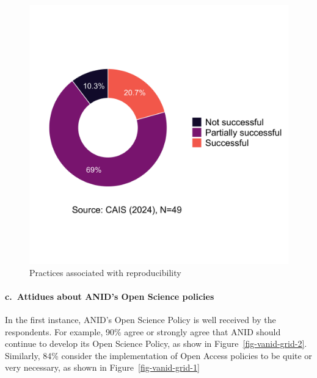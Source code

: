 \documentclass[
  letterpaper,
  DIV=11,
  numbers=noendperiod]{scrartcl}
\let\oldparagraph\paragraph
\renewcommand{\paragraph}[1]{\oldparagraph{#1}\mbox{}}
\begin{document}
\begin{figure}
\begin{minipage}[t]{0.50\linewidth}
{{\includegraphics{paper_files/figure-pdf/fig-reprod-2.png}

}

}

\end{minipage}%

\caption{\label{fig-reprod}Practices associated with reproducibility}

\end{figure}

\hypertarget{c.-attidues-about-anids-open-science-policies}{%
\paragraph{c.~Attidues about ANID's Open Science
policies}\label{c.-attidues-about-anids-open-science-policies}}

In the first instance, ANID's Open Science Policy is well received by
the respondents. For example, 90\% agree or strongly agree that ANID
should continue to develop its Open Science Policy, as show in
Figure~\ref{fig-vanid-grid-2}. Similarly, 84\% consider the
implementation of Open Access policies to be quite or very necessary, as
shown in Figure~\ref{fig-vanid-grid-1}
\end{document}
